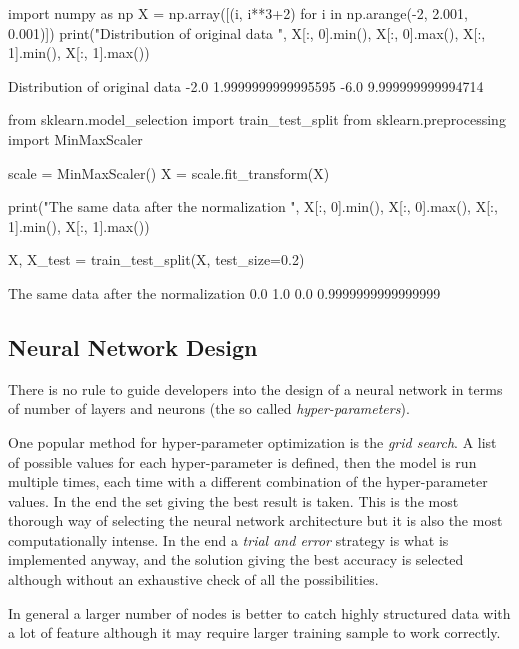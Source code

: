 \begin{ipython}
import numpy as np
X = np.array([(i, i**3+2) for i in np.arange(-2, 2.001, 0.001)])
print("Distribution of original data ", X[:, 0].min(), X[:, 0].max(), 
X[:, 1].min(), X[:, 1].max())
\end{ipython}
\begin{ioutput}
Distribution of original data  -2.0 1.9999999999995595 -6.0 9.999999999994714
\end{ioutput}

\begin{ipython}
from sklearn.model_selection import train_test_split
from sklearn.preprocessing import MinMaxScaler

scale = MinMaxScaler()
X = scale.fit_transform(X)

print("The same data after the normalization ", X[:, 0].min(), X[:, 0].max(), 
X[:, 1].min(), X[:, 1].max())

X, X_test = train_test_split(X, test_size=0.2)
\end{ipython}
\begin{ioutput}
The same data after the normalization  0.0 1.0 0.0 0.9999999999999999
\end{ioutput}

\subsection{Neural Network Design}
\label{neural-network-design}

There is no rule to guide developers into the design of a neural network in terms of number of layers and neurons (the so called \emph{hyper-parameters}). 

One popular method for hyper-parameter optimization is the \emph{grid search}. 
A list of possible values for each hyper-parameter is defined, then the model is run multiple times, each time with a different combination of the hyper-parameter values. In the end the set giving the best result is taken. This is the most thorough way of selecting the neural network architecture but it is also the most computationally intense.
In the end a \emph{trial and error} strategy is what is implemented anyway, and the solution giving the best accuracy is selected although without an exhaustive check of all the possibilities.

In general a larger number of nodes is better to catch highly structured data with a lot of feature although it may require larger training sample to work correctly.

